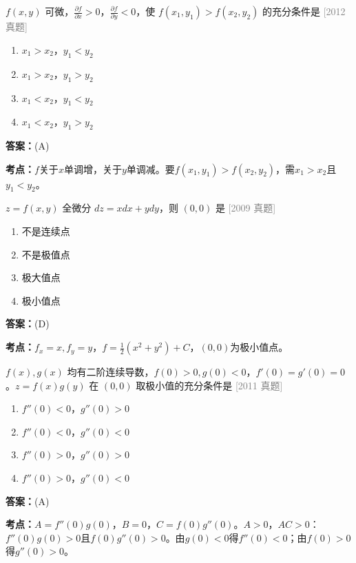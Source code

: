\documentclass[12pt,a4paper]{ctexbook}
\newcommand{\src}[1]{\hfill\textcolor{gray}{\small\textsf{[#1]}}}
\newcommand{\ans}[1]{\begin{answerbox}\textbf{答案：}#1\end{answerbox}}
\newcommand{\kpt}[1]{\textbf{考点：}#1}
\begin{document}
\bigskip

\begin{exercise}
$f(x,y)$ 可微，$\frac{\partial f}{\partial x}>0$，$\frac{\partial f}{\partial y}<0$，使 $f(x_1,y_1)>f(x_2,y_2)$ 的充分条件是 \hfill\src{2012 真题}
\begin{enumerate}[label=(\Alph*),nosep]
  \item $x_1>x_2$，$y_1<y_2$
  \item $x_1>x_2$，$y_1>y_2$
  \item $x_1<x_2$，$y_1<y_2$
  \item $x_1<x_2$，$y_1>y_2$
\end{enumerate}
\end{exercise}
\ans{(A)}
\kpt{$f$关于$x$单调增，关于$y$单调减。要$f(x_1,y_1)>f(x_2,y_2)$，需$x_1>x_2$且$y_1<y_2$。}

\bigskip

\begin{exercise}
$z=f(x,y)$ 全微分 $dz=xdx+ydy$，则 $(0,0)$ 是 \hfill\src{2009 真题}
\begin{enumerate}[label=(\Alph*),nosep]
  \item 不是连续点
  \item 不是极值点
  \item 极大值点
  \item 极小值点
\end{enumerate}
\end{exercise}
\ans{(D)}
\kpt{$f_x=x,f_y=y$，$f=\frac{1}{2}(x^2+y^2)+C$，$(0,0)$为极小值点。}

\bigskip

\begin{exercise}
$f(x),g(x)$ 均有二阶连续导数，$f(0)>0,g(0)<0$，$f'(0)=g'(0)=0$。$z=f(x)g(y)$ 在 $(0,0)$ 取极小值的充分条件是 \hfill\src{2011 真题}
\begin{enumerate}[label=(\Alph*),nosep]
  \item $f''(0)<0$，$g''(0)>0$
  \item $f''(0)<0$，$g''(0)<0$
  \item $f''(0)>0$，$g''(0)>0$
  \item $f''(0)>0$，$g''(0)<0$
\end{enumerate}
\end{exercise}
\ans{(A)}
\kpt{$A=f''(0)g(0)$，$B=0$，$C=f(0)g''(0)$。$A>0$，$AC>0$：$f''(0)g(0)>0$且$f(0)g''(0)>0$。由$g(0)<0$得$f''(0)<0$；由$f(0)>0$得$g''(0)>0$。}

\bigskip
\end{document}
